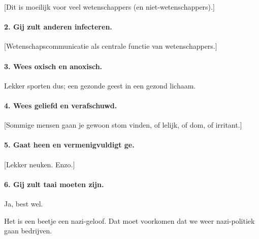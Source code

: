 \documentclass[12pt,a4paper]{article}
\begin{document}
[Dit is moeilijk voor veel wetenschappers (en niet-wetenschappers).]

\paragraph{2. Gij zult anderen infecteren.} 

[Wetenschapscommunicatie als centrale functie van wetenschappers.]

\paragraph{3. Wees oxisch en anoxisch.} Lekker sporten dus; een gezonde geest in een gezond lichaam.

\paragraph{4. Wees geliefd en verafschuwd.}

[Sommige mensen gaan je gewoon stom vinden, of lelijk, of dom, of irritant.]

\paragraph{5. Gaat heen en vermenigvuldigt ge.}

[Lekker neuken. Enzo.]

\paragraph{6. Gij zult taai moeten zijn.}

Ja, best wel.

Het is een beetje een nazi-geloof. Dat moet voorkomen dat we weer nazi-politiek gaan bedrijven.
\end{document}
